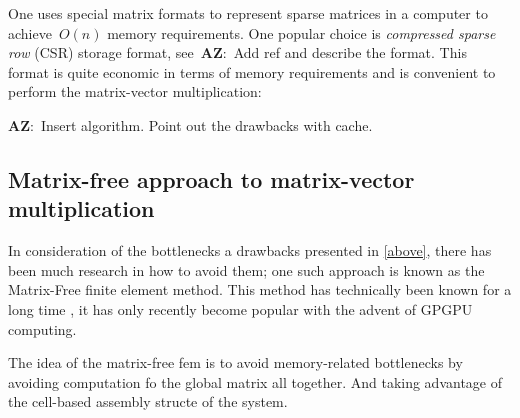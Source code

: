 \documentclass[12pt]{article}
\newcommand{\AZ}[1]{{\color{red}\textbf{AZ}:~#1}}
\newcommand{\dimSize}{n}
\begin{document}
One uses special matrix formats to represent sparse matrices in a computer to achieve~$O(\dimSize)$ memory requirements. One popular choice is \textit{compressed sparse row} (CSR) storage format, see~\AZ{Add ref and describe the format.} This format is quite economic in terms of memory requirements and is convenient to perform the matrix-vector multiplication:

\AZ{Insert algorithm. Point out the drawbacks with cache.}

\subsection{Matrix-free approach to matrix-vector multiplication}

In consideration of the bottlenecks a drawbacks presented in \ref{above}, there has been much research in how to avoid them; one such approach is known as the Matrix-Free finite element method. This method has technically been known for a long time \cite{first paper}, it has only recently become popular with the advent of GPGPU computing\cite{recent papers}. 

The idea of the matrix-free fem is to avoid memory-related bottlenecks by avoiding computation fo the global matrix all together. And taking advantage of the cell-based assembly structe of the system. 
\end{document}
